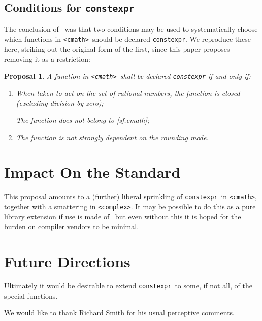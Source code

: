\documentclass[prd,twocolumn,amsmath,amssymb,nofootinbib,eqsecnum]{revtex4-1}
\newcommand{\constexpr}{\code{constexpr}\xspace}
\newcommand{\code}[1]{{\tt #1}}
\newcommand{\header}[1]{{\tt <#1>}}
\newcommand{\cmath}{\header{cmath}}
\newcommand{\complex}{\header{complex}}
\newtheorem*{proposal*}{Proposal}
\begin{document}
\subsection{Conditions for \constexpr}

The conclusion of~\cite{Rosten-constexpr} was that two conditions may be used to systematically choose which functions in \cmath\ should be declared \constexpr. We reproduce these here, striking out the original form of the first, since this paper proposes removing it as a restriction:

\begin{proposal*}
	A function in \cmath\ shall be declared \constexpr if and only if:
	\begin{enumerate}
		\item \st{When taken to act on the set of rational numbers, the function is closed (excluding division 
		by zero);}
		
		The function does not belong to [sf.cmath];
		
		\item The function is not strongly dependent on the rounding mode.
	\end{enumerate}
\end{proposal*}



\section{Impact On the Standard}

This proposal amounts to a (further) liberal sprinkling of \constexpr\ in \cmath, together with a smattering in \complex. It may be possible to do this as a pure library extension if use is made of~\cite{ConstEval} but even without this it is hoped for the burden on compiler vendors to be minimal.

\section{Future Directions}

Ultimately it would be desirable to extend \constexpr\ to some, if not all, of the special functions.


\begin{acknowledgments}
	We would like to thank Richard Smith for his usual perceptive comments.
\end{acknowledgments}
\end{document}

